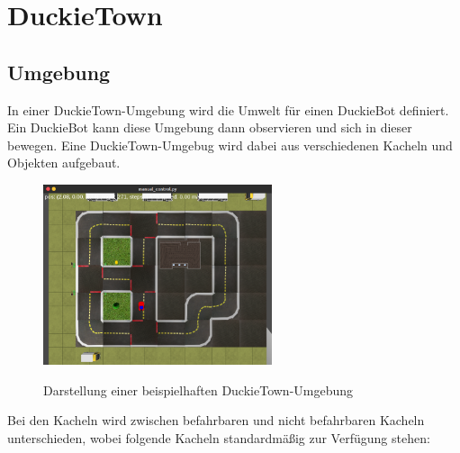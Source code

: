 \chapter{DuckieTown}

\section{Umgebung}

In einer DuckieTown-Umgebung wird die Umwelt für einen DuckieBot definiert. Ein DuckieBot kann diese Umgebung dann observieren und sich in dieser bewegen. Eine DuckieTown-Umgebug wird dabei aus verschiedenen Kacheln und Objekten aufgebaut. 

\begin{figure}[H]
	\centering
	\includegraphics[width=0.6\textwidth]{kapitel2/images/duckietown-umgebung.png}
	\label{fig:duckietown-umgebung}
	\caption{Darstellung einer beispielhaften DuckieTown-Umgebung}
\end{figure}

Bei den Kacheln wird zwischen befahrbaren und nicht befahrbaren Kacheln unterschieden, wobei folgende Kacheln standardmäßig zur Verfügung stehen:

